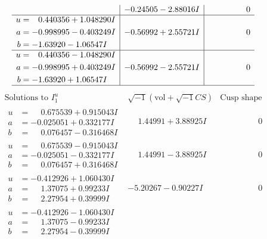 \documentclass[1p]{elsarticle_modified}
\theoremstyle{definition}
\newcommand{\I}{\sqrt{-1}}
\begin{document}
$$\begin{array}{c|c|c}
 & -0.24505 - 2.88016 I & \phantom{-0.000000 } 0 \\ \hline\begin{aligned}
u &= \phantom{-}0.440356 + 1.048290 I \\
a &= -0.998995 - 0.403249 I \\
b &= -1.63920 - 1.06547 I\end{aligned}
 & -0.56992 + 2.55721 I & \phantom{-0.000000 } 0 \\ \hline\begin{aligned}
u &= \phantom{-}0.440356 - 1.048290 I \\
a &= -0.998995 + 0.403249 I \\
b &= -1.63920 + 1.06547 I\end{aligned}
 & -0.56992 - 2.55721 I & \phantom{-0.000000 } 0\\
 \hline 
 \end{array}$$\newpage$$\begin{array}{c|c|c}  
\text{Solutions to }I^u_{1}& \I (\text{vol} + \sqrt{-1}CS) & \text{Cusp shape}\\
 \hline 
\begin{aligned}
u &= \phantom{-}0.675539 + 0.915043 I \\
a &= -0.025051 + 0.332177 I \\
b &= \phantom{-}0.076457 - 0.316468 I\end{aligned}
 & \phantom{-}1.44991 + 3.88925 I & \phantom{-0.000000 } 0 \\ \hline\begin{aligned}
u &= \phantom{-}0.675539 - 0.915043 I \\
a &= -0.025051 - 0.332177 I \\
b &= \phantom{-}0.076457 + 0.316468 I\end{aligned}
 & \phantom{-}1.44991 - 3.88925 I & \phantom{-0.000000 } 0 \\ \hline\begin{aligned}
u &= -0.412926 + 1.060430 I \\
a &= \phantom{-}1.37075 + 0.99233 I \\
b &= \phantom{-}2.27954 + 0.39999 I\end{aligned}
 & -5.20267 - 0.90227 I & \phantom{-0.000000 } 0 \\ \hline\begin{aligned}
u &= -0.412926 - 1.060430 I \\
a &= \phantom{-}1.37075 - 0.99233 I \\
b &= \phantom{-}2.27954 - 0.39999 I\end{aligned}

\end{array}$$
\end{document}
